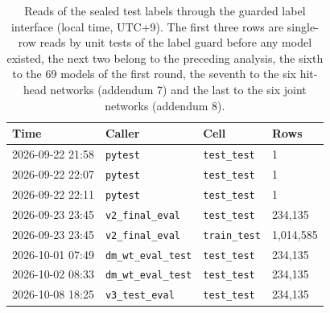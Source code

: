 \begin{table}[h]
\caption{Reads of the sealed test labels through the guarded label interface (local time, UTC+9). The first three rows are single-row reads by unit tests of the label guard before any model existed, the next two belong to the preceding analysis, the sixth to the 69 models of the first round, the seventh to the six hit-head networks (addendum 7) and the last to the six joint networks (addendum 8).}
\label{tab:si_access}
\small
\begin{tabular}{llll}
\toprule
Time & Caller & Cell & Rows \\
\midrule
2026-09-22 21:58 & \texttt{pytest} & \texttt{test\_test} & 1 \\
2026-09-22 22:07 & \texttt{pytest} & \texttt{test\_test} & 1 \\
2026-09-22 22:11 & \texttt{pytest} & \texttt{test\_test} & 1 \\
2026-09-23 23:45 & \texttt{v2\_final\_eval} & \texttt{test\_test} & 234{,}135 \\
2026-09-23 23:45 & \texttt{v2\_final\_eval} & \texttt{train\_test} & 1{,}014{,}585 \\
2026-10-01 07:49 & \texttt{dm\_wt\_eval\_test} & \texttt{test\_test} & 234{,}135 \\
2026-10-02 08:33 & \texttt{dm\_wt\_eval\_test} & \texttt{test\_test} & 234{,}135 \\
2026-10-08 18:25 & \texttt{v3\_test\_eval} & \texttt{test\_test} & 234{,}135 \\
\bottomrule
\end{tabular}
\end{table}
